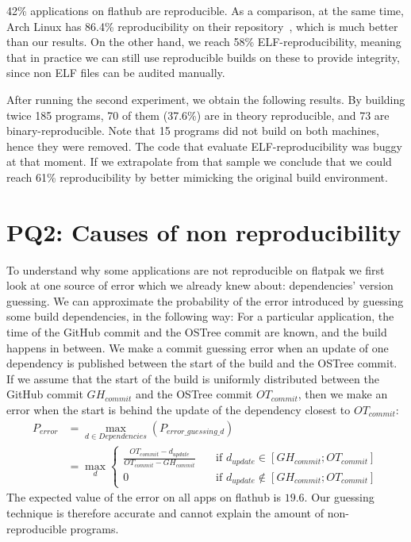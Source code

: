 \documentclass[a4paper,11pt,oneside]{report}
\theoremstyle{definition}
\newcommand{\rb}{reproducible builds\xspace}
\newcommand{\fp}{flatpak\xspace}
\newcommand{\fh}{flathub\xspace}
\newcommand{\ot}{OSTree\xspace}
\begin{document}
42\% applications on \fh are reproducible. As a comparison, at the same time,
Arch Linux has 86.4\% reproducibility on their
repository~\cite{arch-rebuilderd}, which is much better than our results. On
the other hand, we reach 58\% ELF-reproducibility, meaning that in practice we
can still use \rb on these to provide integrity, since non ELF files can be
audited manually.

\label{sec:theo-repro}
After running the second experiment, we obtain the following results. By
building twice 185 programs, 70 of them (37.6\%) are in theory reproducible,
and 73 are binary-reproducible. Note that 15 programs did not build on both
machines, hence they were removed. The code that evaluate ELF-reproducibility
was buggy at that moment. If we extrapolate from that sample we conclude that
we could reach 61\% reproducibility by better mimicking the original build
environment.


\section{PQ2: Causes of non reproducibility}
\label{sec:pq2}

To understand why some applications are not reproducible on \fp we first look
at one source of error which we already knew about: dependencies' version
guessing. We can approximate the probability of the error introduced by
guessing some build dependencies, in the following way: For a particular
application, the time of the GitHub commit and the \ot commit are known, and the
build happens in between. We make a commit guessing error when an update of one
dependency is published between the start of the build and the \ot commit. If
we assume that the start of the build is uniformly distributed between the
GitHub commit $GH_{commit}$ and the \ot commit $OT_{commit}$, then we make an
error when the start is behind the update of the dependency closest to
$OT_{commit}$:
\begin{align*}
    P_{error} &= \max_{d \in Dependencies}(P_{error\_guessing\_d}) \\
              &= \max_{d}
              \begin{cases}
                \frac{OT_{commit} - d_{update}}{OT_{commit} -
                    GH_{commit}}  & \quad \text{if } d_{update}
                    \in [GH_{commit}; OT_{commit}] \\
                0  & \quad \text{if } d_{update}
                  \notin [GH_{commit}; OT_{commit}]
              \end{cases}
\end{align*}
The expected value of the error on all apps on \fh is $19.6$. Our guessing
technique is therefore accurate and cannot explain the amount of
non-reproducible programs.
\end{document}
